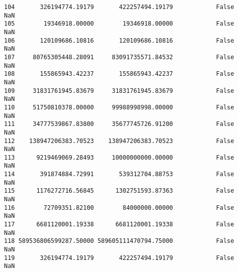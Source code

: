 \documentclass[11pt]{article}
\begin{document}
\begin{tcolorbox}[breakable, size=fbox, boxrule=.5pt, pad at break*=1mm, opacityfill=0]
\begin{Verbatim}[commandchars=\\\{\}]
104       326194774.19179       422257494.19179            False       NaN
105        19346918.00000        19346918.00000            False       NaN
106       120109686.10816       120109686.10816            False       NaN
107     80765305448.28091     83091735571.84532            False       NaN
108       155865943.42237       155865943.42237            False       NaN
109     31831761945.83679     31831761945.83679            False       NaN
110     51750810378.00000     99988998998.00000            False       NaN
111     34777539867.83800     35677745726.91200            False       NaN
112    138947206383.70523    138947206383.70523            False       NaN
113      9219469069.28493     10000000000.00000            False       NaN
114       391874884.72991       539312704.88753            False       NaN
115      1176272716.56845      1302751593.87363            False       NaN
116        72709351.82100        84000000.00000            False       NaN
117      6681120001.19338      6681120001.19338            False       NaN
118 589536806599287.50000 589605111470794.75000            False       NaN
119       326194774.19179       422257494.19179            False       NaN


\end{Verbatim}
\end{tcolorbox}
\end{document}

